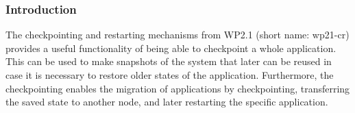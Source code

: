 





\subsubsection{Introduction}
The checkpointing and restarting mechanisms from WP2.1 (short name:
wp21-cr) provides a useful functionality of being able to checkpoint a
whole application. This can be used to make snapshots of the system that
later can be reused in case it is necessary to restore older states of
the application. Furthermore, the checkpointing enables the migration of
applications by checkpointing, transferring the saved state to another
node, and later restarting the specific application.

